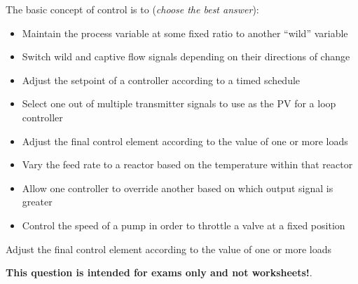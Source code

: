 

The basic concept of  control is to ({\it choose the best answer}):

\begin{itemize}
\item{} Maintain the process variable at some fixed ratio to another ``wild'' variable
\vskip 5pt 
\item{} Switch wild and captive flow signals depending on their directions of change
\vskip 5pt 
\item{} Adjust the setpoint of a controller according to a timed schedule 
\vskip 5pt 
\item{} Select one out of multiple transmitter signals to use as the PV for a loop controller
\vskip 5pt 
\item{} Adjust the final control element according to the value of one or more loads
\vskip 5pt 
\item{} Vary the feed rate to a reactor based on the temperature within that reactor
\vskip 5pt 
\item{} Allow one controller to override another based on which output signal is greater 
\vskip 5pt 
\item{} Control the speed of a pump in order to throttle a valve at a fixed position
\end{itemize}







Adjust the final control element according to the value of one or more loads







{\bf This question is intended for exams only and not worksheets!}.



